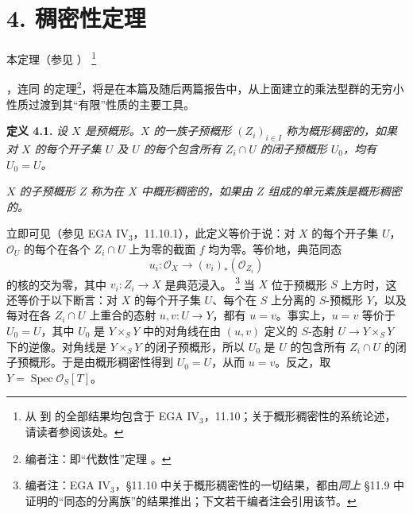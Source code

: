 
\setcounter{footnote}{10}

\section*{4. 稠密性定理}

本定理（参见 ）%
\begingroup
\renewcommand{\thefootnote}{\(\ast\)}%
\footnote{从  到  的全部结果均包含于 EGA IV\(_3\)，11.10；关于概形稠密性的系统论述，请读者参阅该处。}%
\addtocounter{footnote}{-1}%
\endgroup，连同  的定理\footnote{编者注：即“代数性”定理 。}，将是在本篇及随后两篇报告中，从上面建立的乘法型群的无穷小性质过渡到其“有限”性质的主要工具。

\medskip
\noindent{}\textbf{定义 4.1.}
\textit{设 \(X\) 是预概形。\(X\) 的一族子预概形 \((Z_i)_{i\in I}\) 称为\emph{概形稠密的}，如果对 \(X\) 的每个开子集 \(U\) 及 \(U\) 的每个包含所有 \(Z_i\cap U\) 的闭子预概形 \(U_0\)，均有 \(U_0=U\)。}

\textit{\(X\) 的子预概形 \(Z\) 称为\emph{在 \(X\) 中概形稠密的}，如果由 \(Z\) 组成的单元素族是概形稠密的。}

立即可见（参见 EGA IV\(_3\)，11.10.1），此定义等价于说：对 \(X\) 的每个开子集 \(U\)，\(\mathscr O_U\) 的每个在各个 \(Z_i\cap U\) 上为零的截面 \(f\) 均为零。等价地，典范同态
\[
  u_i:\mathscr O_X\longrightarrow (v_i)_*(\mathscr O_{Z_i})
\]
的核的交为零，其中 \(v_i:Z_i\to X\) 是典范浸入。%
\footnote{编者注：EGA IV\(_3\)，\S11.10 中关于概形稠密性的一切结果，都由\emph{同上} \S11.9 中证明的“同态的分离族”的结果推出；下文若干编者注会引用该节。}
当 \(X\) 位于预概形 \(S\) 上方时，这还等价于以下断言：对 \(X\) 的每个开子集 \(U\)、每个在 \(S\) 上分离的 \(S\)-预概形 \(Y\)，以及每对在各 \(Z_i\cap U\) 上重合的态射 \(u,v:U\to Y\)，都有 \(u=v\)。事实上，\(u=v\) 等价于 \(U_0=U\)，其中 \(U_0\) 是 \(Y\times_S Y\) 中的对角线在由 \((u,v)\) 定义的 \(S\)-态射 \(U\to Y\times_S Y\) 下的逆像。对角线是 \(Y\times_S Y\) 的闭子预概形，所以 \(U_0\) 是 \(U\) 的包含所有 \(Z_i\cap U\) 的闭子预概形。于是由概形稠密性得到 \(U_0=U\)，从而 \(u=v\)。反之，取 \(Y=\operatorname{Spec}\mathscr O_S[T]\)。

